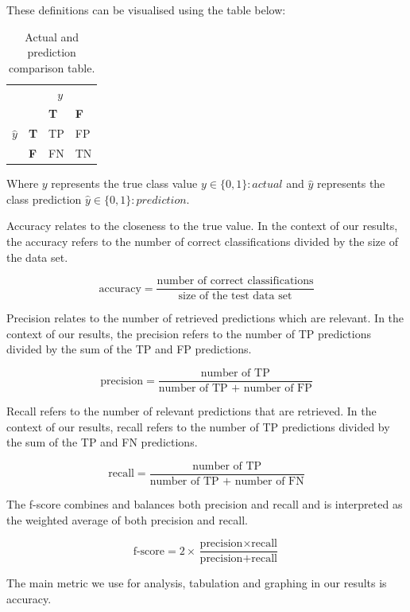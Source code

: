 These definitions can be visualised using the table below:

\begin{table}[tbh!]
\centering
\begin{tabular}{r|l|l|l|}
\multicolumn{1}{r}{}
 &  \multicolumn{3}{c}{$y$} \\
 \cline{2-4}
& & \textbf{T} & \textbf{F} \\ 
\cline{2-4}
$\hat{y}$ & \textbf{T} & TP & FP \\
\cline{2-4}
& \textbf{F} & FN & TN \\
\cline{2-4}
\end{tabular}
\caption{Actual and prediction comparison table.}
	\label{tab:revpol}
\end{table}

Where $y$ represents the true class value $y \in \{0,1\} : actual$ and $\hat{y}$ represents the class prediction $\hat{y} \in \{0,1\} : prediction$.

Accuracy relates to the closeness to the true value. In the context of our results, the accuracy refers to the number of correct classifications 
divided by the size of the data set.

\[ \text{accuracy} = \frac{\text{number of correct classifications}}{\text{size of the test data set}}\]

Precision relates to the number of retrieved predictions which are relevant. In the context of our results, the precision refers to the number of TP predictions 
divided by the sum of the TP and FP predictions.

\[ \text{precision} = \frac{\text{number of TP}}{\text{number of TP + number of FP}}\]

Recall refers to the number of relevant predictions that are retrieved. In the context of our results, recall refers to the number of TP predictions 
divided by the sum of the TP and FN predictions.

\[ \text{recall} = \frac{\text{number of TP}}{\text{number of TP + number of FN}}\]

The f-score combines and balances both precision and recall and is interpreted as the weighted average of both precision and recall. 

\[ \text{f-score} = 2 \times \frac{\text{precision} \times \text{recall}}{\text{precision} + \text{recall}}\]

The main metric we use for analysis, tabulation and graphing in our results is accuracy.

